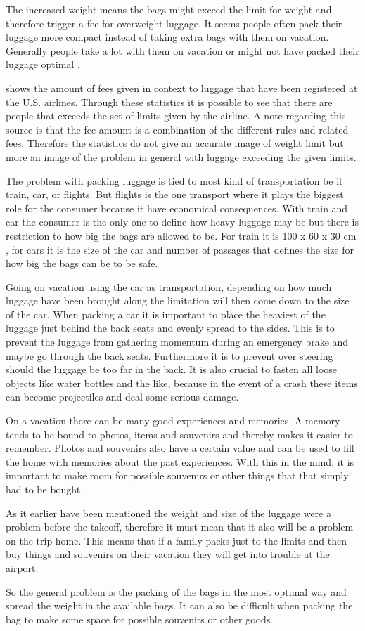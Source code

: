 The increased weight means the bags might exceed the limit for weight and therefore trigger a fee for overweight luggage.
It seems people often pack their luggage more compact instead of taking extra bags with them on vacation. Generally people take a lot with them on vacation or might not have packed their luggage optimal \citep{airstat}.

\citep{airstat} shows the amount of fees given in context to luggage that have been registered at the U.S. airlines. Through these statistics it is possible to see that there are people that exceeds the set of limits given by the airline. A note regarding this source is that the fee amount is a combination of the different rules and related fees. Therefore the statistics do not give an accurate image of weight limit but more an image of the problem in general with luggage exceeding the given limits.

The problem with packing luggage is tied to most kind of transportation be it train, car, or flights. But flights is the one transport where it plays the biggest role for the consumer because it have economical consequences. With train and car the consumer is the only one to define how heavy luggage may be but there is restriction to how big the bags are allowed to be. For train it is 100 x 60 x 30 cm \citep{rulestrain}, for cars it is the size of the car and number of passages that defines the size for how big the bags can be to be safe.

Going on vacation using the car as transportation, depending on how much luggage have been brought along the limitation will then come down to the size of the car. When packing a car it is important to place the heaviest of the luggage just behind the back seats and evenly spread to the sides. This is to prevent the luggage from gathering momentum during an emergency brake and maybe go through the back seats. Furthermore it is to prevent over steering should the luggage be too far in the back. It is also crucial to fasten all loose objects like water bottles and the like, because in the event of a crash these items can become projectiles and deal some serious damage\citep{Farlig_bagage}.

On a vacation there can be many good experiences and memories. A memory tends to be bound to photos, items and souvenirs and thereby makes it easier to remember. Photos and souvenirs also have a certain value and can be used to fill the home with memories about the past experiences.
With this in the mind, it is important to make room for possible souvenirs or other things that that simply had to be bought.

As it earlier have been mentioned the weight and size of the luggage were a problem before the takeoff, therefore it must mean that it also will be a problem on the trip home.
This means that if a family packs just to the limits and then buy things and souvenirs on their vacation they will get into trouble at the airport.

So the general problem is the packing of the bags in the most optimal way and spread the weight in the available bags. It can also be difficult when packing the bag to make some space for possible souvenirs or other goods.